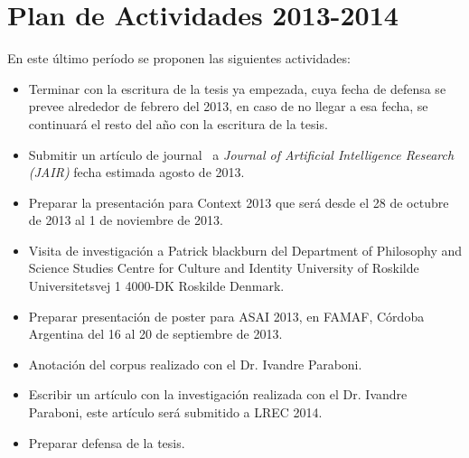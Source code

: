 \section{Plan de Actividades 2013-2014}
\label{plandetrabajo}

En este \'ultimo per\'iodo se proponen las siguientes actividades:

\begin{itemize}

\item Terminar con la escritura de la tesis ya empezada, cuya fecha de defensa se prevee alrededor de febrero del 2013, en caso de no llegar a esa fecha, se continuar\'a el resto del a\~no con la escritura de la tesis.
\item Submitir un art\'iculo de journal~\cite{benotti-altamirano-jair} a \emph{Journal of Artificial Intelligence Research (JAIR)} fecha estimada agosto de 2013.
\item Preparar la presentaci\'on para Context 2013 que ser\'a desde el 28 de octubre de 2013 al 1 de noviembre de 2013.
\item Visita de investigaci\'on a Patrick blackburn del Department of Philosophy and Science Studies Centre for Culture and Identity University of Roskilde Universitetsvej 1 4000-DK Roskilde Denmark.
\item Preparar presentaci\'on de poster para ASAI 2013, en FAMAF, C\'ordoba Argentina del 16 al 20 de septiembre de 2013.
\item Anotaci\'on del corpus realizado con el Dr. Ivandre Paraboni.
\item Escribir un art\'iculo con la investigaci\'on realizada con el Dr. Ivandre Paraboni, este art\'iculo ser\'a submitido a LREC 2014.
\item Preparar defensa de la tesis.

\end{itemize}

